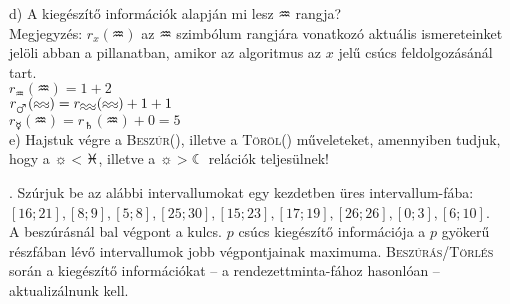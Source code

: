 \documentclass[12pt]{article}
\begin{document}
\noindent d) A kiegészítő információk alapján mi lesz $\aquarius$ rangja?\\
Megjegyzés: $r_{x}(\aquarius)$ az $\aquarius$ szimbólum rangjára vonatkozó aktuális ismereteinket jelöli abban a pillanatban, amikor az algoritmus az $x$ jelű csúcs feldolgozásánál tart. \\
$r_{\aquarius}(\aquarius)=1+2$\\
$r_{\mars}(\aquarius)=r_{\aquarius}(\aquarius)+1+1$\\
$r_{\mercury}(\aquarius)=r_{\saturn}(\aquarius)+0=5$\\

\noindent e) Hajstuk végre a {\scshape Beszúr(\sun)}, illetve a {\scshape Töröl(\pisces)} műveleteket, amennyiben tudjuk, hogy a $\sun < \pisces$, illetve a $\sun > \leftmoon$ relációk teljesülnek!

\begin{figure}[!h]
\centering
\end{figure}

. Szúrjuk be az alábbi intervallumokat egy kezdetben üres intervallum-fába: \\
$[16;21], [8;9], [5;8], [25;30], [15;23], [17;19],
[26;26], [0;3], [6;10]$.\\
A beszúrásnál bal végpont a kulcs. $p$ csúcs kiegészítő információja a $p$ gyökerű részfában lévő intervallumok jobb végpontjainak maximuma.
{\scshape Beszúrás/Törlés} során a kiegészítő információkat -- a rendezettminta-fához hasonlóan -- aktualizálnunk kell.
\end{document}
